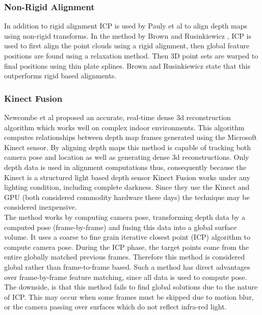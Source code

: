 \subsubsection{Non-Rigid Alignment}

In addition to rigid alignment ICP is used by Pauly et al \cite{Pauly05Example,Brown07Global} to align depth maps using non-rigid transforms. In the method by Brown and Rusinkiewicz \cite{Brown07Global}, ICP is used to first align the point clouds using a rigid alignment, then global feature positions are found using a relaxation method. Then 3D point sets are warped to final positions using thin plate splines. Brown and Rusinkiewicz state that this outperforms rigid based alignments.


\subsubsection{Kinect Fusion}

Newcombe et al \cite{Newcombe11Kinectfusion,Izadi11Kinectfusion} proposed an accurate, real-time dense 3d reconstruction algorithm which works well on complex indoor environments. This algorithm computes relationships between depth map frames generated using the Microsoft Kinect \cite{Zhang12Microsoft} sensor. By aligning depth maps this method is capable of tracking both camera pose and location as well as generating dense 3d reconstructions. Only depth data is used in alignment computations thus, consequently because the Kinect is a structured light based depth sensor Kinect Fusion works under any lighting condition, including complete darkness. Since they use the Kinect and GPU (both considered commodity hardware these days) the technique may be considered inexpensive. \\

The method works by computing camera pose, transforming depth data by a computed pose (frame-by-frame) and fusing this data into a global surface volume. It uses a coarse to fine grain iterative closest point (ICP) algorithm to compute camera pose. During the ICP phase, the target points come from the entire globally matched previous frames. Therefore this method is considered global rather than frame-to-frame based. Such a method has direct advantages over frame-by-frame feature matching, since all data is used to compute pose. The downside, is that this method fails to find global solutions due to the nature of ICP. This may occur when some frames must be skipped due to motion blur, or the camera passing over surfaces which do not reflect infra-red light. \\

